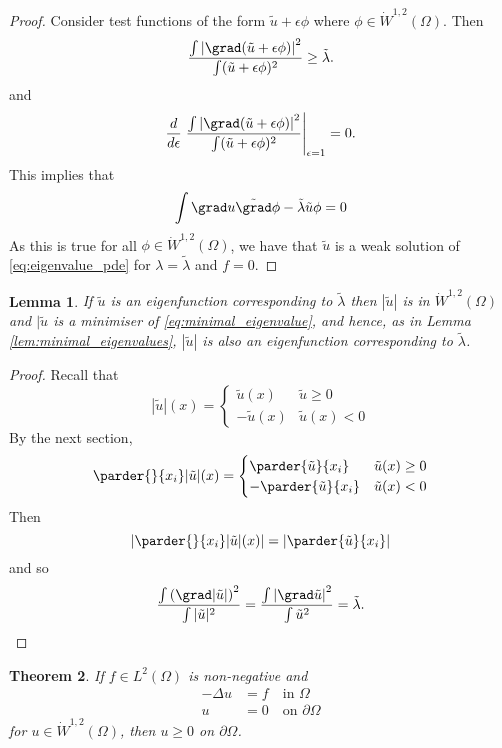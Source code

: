 \documentclass[10pt, oneside, reqno]{amsart}
\theoremstyle{plain}%
\newtheorem{thm}{Theorem}[section]
\newtheorem{lem}[thm]{Lemma}
\numberwithin{equation}{section}
\theoremstyle{definition}
\theoremstyle{remark}
\begin{document}
\begin{proof}
    Consider test functions of the form $\tilde u + \epsilon \phi$ where $\phi \in \dot W^{1, 2}(\Omega)$. Then \[
        \frac{\int \left| \grad(\tilde u + \epsilon \phi) \right|^2}{\int (\tilde u + \epsilon \phi)^2} \geq \tilde \lambda.
    \]  and \[
        \frac{d}{d\epsilon} \left.\frac{\int \left| \grad(\tilde u + \epsilon \phi) \right|^2}{\int (\tilde u + \epsilon \phi)^2} \right|_{\epsilon = 1} = 0.
    \]  This implies that \[
        \int \grad u \tilde \grad \phi - \tilde \lambda \tilde u \phi = 0
    \]  As this is true for all $\phi \in \dot W^{1, 2}(\Omega)$, we have that $\tilde u$ is a weak solution of \eqref{eq:eigenvalue_pde} for $\lambda = \tilde \lambda$ and $f = 0$.
\end{proof}


\begin{lem}
    If $\tilde u$ is an eigenfunction corresponding to $\tilde \lambda$ then $|\tilde u |$ is in $\dot W^{1, 2}(\Omega)$ and $|\tilde u$ is a minimiser of \eqref{eq:minimal_eigenvalue}, and hence, as in Lemma \ref{lem:minimal_eigenvalues}, $|\tilde u|$ is also an eigenfunction corresponding to $\tilde \lambda$.   
\end{lem}


\begin{proof}
    
Recall that \[
    |\tilde u |(x) = \begin{cases}
        \tilde u(x)     & \tilde u \geq 0 \\
        -\tilde u(x)    & \tilde u(x) < 0
    \end{cases}
\]  By the next section, \[
    \parder{}{x_i}|\tilde u|(x) = \begin{cases}
        \parder{\tilde u}{x_i}  & \tilde u(x) \geq 0 \\
        -\parder{\tilde u}{x_i} & \tilde u(x) < 0 \\
    \end{cases}
\]  Then \[
    \left| \parder{}{x_i} |\tilde u|(x) \right| = \left| \parder{\tilde u}{x_i} \right|
\] and so \[
    \frac{\int \left(\grad|\tilde u| \right)^2}{\int |\tilde u |^2}  = \frac{\int \left| \grad \tilde u \right|^2}{\int \tilde u^2} = \tilde \lambda. \qedhere
\]
\end{proof}

\begin{thm}
    If $f \in L^2(\Omega)$ is non-negative and \begin{align*}
        -\Delta u &= f \quad \text{in $\Omega$} \\
        u &= 0 \quad \text{on $\partial \Omega$}
    \end{align*} for $u \in \dot W^{1, 2}(\Omega)$, then $u \geq 0$ on $\partial \Omega$.  
\end{thm}
\end{document}
